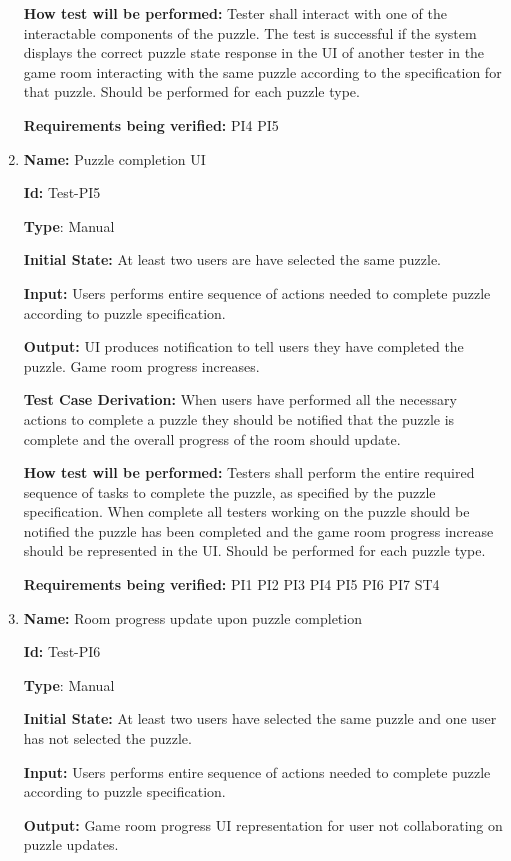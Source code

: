\documentclass[12pt, titlepage]{article}
\begin{document}
\begin{enumerate}
\textbf{How test will be performed:}
Tester shall interact with one of the interactable components of the puzzle. The test is successful if the system displays the correct puzzle state response in the UI of another tester in the game room interacting with the same puzzle according to the specification for that puzzle. Should be performed for each puzzle type.

\textbf{Requirements being verified: } PI4 PI5

\item{\textbf{Name:} Puzzle completion UI} \label{itm:Test-PI5}

\textbf{Id:} Test-PI5

\textbf{Type}: Manual

\textbf{Initial State:} At least two users are have selected the same puzzle.

\textbf{Input:} Users performs entire sequence of actions needed to complete puzzle according to puzzle specification.

\textbf{Output:} UI produces notification to tell users they have completed the puzzle. Game room progress increases.

\textbf{Test Case Derivation:}
When users have performed all the necessary actions to complete a puzzle they should be notified that the puzzle is complete and the overall progress of the room should update.

\textbf{How test will be performed:}
Testers shall perform the entire required sequence of tasks to complete the puzzle, as specified by the puzzle specification. When complete all testers working on the puzzle should be notified the puzzle has been completed and the game room progress increase should be represented in the UI. Should be performed for each puzzle type.

\textbf{Requirements being verified: } PI1 PI2 PI3 PI4 PI5 PI6 PI7 ST4

\item{\textbf{Name:} Room progress update upon puzzle completion} \label{itm:Test-PI6}

\textbf{Id:} Test-PI6

\textbf{Type}: Manual

\textbf{Initial State:} At least two users have selected the same puzzle and one user has not selected the puzzle.

\textbf{Input:} Users performs entire sequence of actions needed to complete puzzle according to puzzle specification.

\textbf{Output:} Game room progress UI representation for user not collaborating on puzzle updates.


\end{enumerate}
\end{document}
